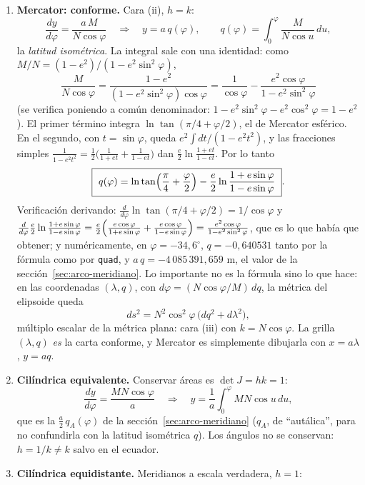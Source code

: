 \begin{enumerate}[label=(\alph*)]
  \item \textbf{Mercator: conforme.} Cara (ii), \(h=k\):
  \[
    \frac{dy}{d\varphi}=\frac{a\,M}{N\cos\varphi}
    \quad\Longrightarrow\quad
    y=a\,q(\varphi),\qquad
    q(\varphi)=\int_0^\varphi\frac{M}{N\cos u}\,du ,
  \]
  la \emph{latitud isométrica}. La integral sale con una identidad: como
  \(M/N=(1-e^2)/(1-e^2\sin^2\varphi)\),
  \[
    \frac{M}{N\cos\varphi}=\frac{1-e^2}{(1-e^2\sin^2\varphi)\cos\varphi}
    =\frac1{\cos\varphi}-\frac{e^2\cos\varphi}{1-e^2\sin^2\varphi}
  \]
  (se verifica poniendo a común denominador: \(1-e^2\sin^2\varphi-e^2\cos^2\varphi=1-e^2\)).
  El primer término integra \(\ln\tan(\pi/4+\varphi/2)\), el de Mercator esférico. En el
  segundo, con \(t=\sin\varphi\), queda \(e^2\int dt/(1-e^2t^2)\), y las fracciones simples
  \(\frac1{1-e^2t^2}=\frac12\bigl(\frac1{1+et}+\frac1{1-et}\bigr)\) dan
  \(\frac e2\ln\frac{1+et}{1-et}\). Por lo tanto
  \[
    \boxed{\ q(\varphi)=\ln\tan\Bigl(\frac\pi4+\frac\varphi2\Bigr)
    -\frac e2\ln\frac{1+e\sin\varphi}{1-e\sin\varphi}\ } .
  \]
  Verificación derivando: \(\frac{d}{d\varphi}\ln\tan(\pi/4+\varphi/2)=1/\cos\varphi\) y
  \(\frac{d}{d\varphi}\frac e2\ln\frac{1+e\sin\varphi}{1-e\sin\varphi}
  =\frac e2\Bigl(\frac{e\cos\varphi}{1+e\sin\varphi}+\frac{e\cos\varphi}{1-e\sin\varphi}\Bigr)
  =\frac{e^2\cos\varphi}{1-e^2\sin^2\varphi}\), que es lo que había que obtener; y
  numéricamente, en \(\varphi=-34{,}6^\circ\), \(q=-0{,}640531\) tanto por la fórmula como
  por \texttt{quad}, y \(a\,q=-4\,085\,391{,}659\) m, el valor de la sección~\ref{sec:arco-meridiano}.
  Lo importante no es la fórmula sino lo que hace: en las coordenadas \((\lambda,q)\), con
  \(d\varphi=(N\cos\varphi/M)\,dq\), la métrica del elipsoide queda
  \[
    ds^2=N^2\cos^2\varphi\,\bigl(dq^2+d\lambda^2\bigr),
  \]
  múltiplo escalar de la métrica plana: cara (iii) con \(k=N\cos\varphi\). La grilla
  \((\lambda,q)\) \emph{es} la carta conforme, y Mercator es simplemente dibujarla con
  \(x=a\lambda\), \(y=aq\).
  \item \textbf{Cilíndrica equivalente.} Conservar áreas es \(\det J=hk=1\):
  \[
    \frac{dy}{d\varphi}=\frac{MN\cos\varphi}{a}\quad\Longrightarrow\quad
    y=\frac1a\int_0^\varphi MN\cos u\,du ,
  \]
  que es la \(\tfrac a2\,q_A(\varphi)\) de la sección~\ref{sec:arco-meridiano} (\(q_A\), de ``autálica'', para no
  confundirla con la latitud isométrica \(q\)). Los ángulos no se conservan: \(h=1/k\neq k\) salvo en el
  ecuador.
  \item \textbf{Cilíndrica equidistante.} Meridianos a escala verdadera, \(h=1\):

\end{enumerate}
